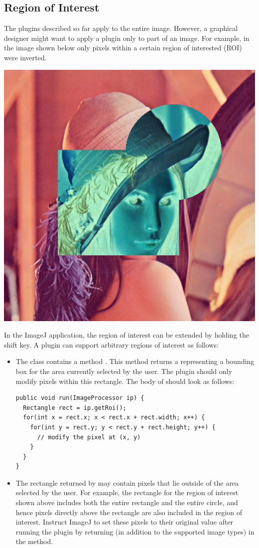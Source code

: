 \documentclass{book}
\begin{document}
\subsection*{Region of Interest}
The plugins described so far apply to the entire image. However, a graphical designer might want to apply a plugin only to part of an image. For example, in the image shown below only pixels within a certain region of interested (ROI) were inverted.
\begin{center}
\includegraphics[scale=0.2]{lena-inverted-partially.png}
\end{center}
In the ImageJ application, the region of interest can be extended by holding the shift key. A plugin can support arbitrary regions of interest as follows:
\begin{itemize}
  \item The class  contains a method . This method returns a  representing a bounding box for the area currently selected by the user. The plugin should only modify pixels within this rectangle. The body of  should look as follows:
  \begin{lstlisting}
public void run(ImageProcessor ip) {
  Rectangle rect = ip.getRoi();
  for(int x = rect.x; x < rect.x + rect.width; x++) {
    for(int y = rect.y; y < rect.y + rect.height; y++) {
      // modify the pixel at (x, y)
    }
  }
}
  \end{lstlisting}
  \item The rectangle returned by  may contain pixels that lie outside of the area selected by the user. For example, the rectangle for the region of interest shown above includes both the entire rectangle and the entire circle, and hence pixels directly above the rectangle are also included in the region of interest. Instruct ImageJ to set these pixels to their original value after running the plugin by returning  (in addition to the supported image types) in the  method. 
\end{itemize}
\end{document}

